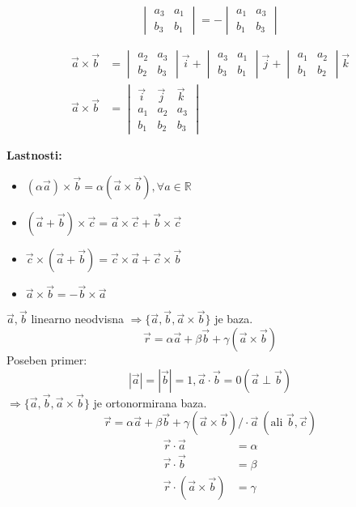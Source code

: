 \[
\begin{vmatrix}
a_3 & a_1\\
b_3 & b_1
\end{vmatrix}
= -
\begin{vmatrix}
a_1 & a_3 \\
b_1 & b_3
\end{vmatrix}
\]

\begin{align*}
	\vec{a} \times \vec{b} &= 
	\begin{vmatrix}
	a_2 & a_3\\
	b_2 & b_3
	\end{vmatrix}
	\vec{i} +
	\begin{vmatrix}
	a_3 & a_1 \\
	b_3 & b_1
	\end{vmatrix}
	\vec{j} +
	\begin{vmatrix}
	a_1 & a_2 \\
	b_1 & b_2
	\end{vmatrix}
	\vec{k}\\
	\vec{a} \times \vec{b} &=
	\begin{vmatrix}
	\vec{i} & \vec{j} & \vec{k}\\
	a_1 & a_2 & a_3 \\
	b_1 & b_2 & b_3
	\end{vmatrix}
\end{align*}

\textbf{Lastnosti:}
\begin{itemize}
	\item $(\alpha \vec{a}) \times \vec{b} = \alpha (\vec{a} \times \vec{b}), \forall a \in \mathbb{R}$
	\item $(\vec{a} + \vec{b}) \times \vec{c} = \vec{a} \times \vec{c} + \vec{b} \times \vec{c}$
	\item $\vec{c} \times (\vec{a} + \vec{b}) = \vec{c} \times \vec{a} + \vec{c} \times \vec{b}$
	\item $\vec{a} \times \vec{b} = - \vec{b} \times \vec{a}$
\end{itemize}

$\vec{a}, \vec{b}$ linearno neodvisna $\Rightarrow \{\vec{a}, \vec{b}, \vec{a} \times \vec{b}\}$ je baza.
\[\vec{r} = \alpha \vec{a} + \beta \vec{b} + \gamma(\vec{a} \times \vec{b})\]
Poseben primer:
\[|\vec{a}| = |\vec{b}| = 1, \vec{a} \cdot \vec{b} = 0 (\vec{a} \perp \vec{b})\]
$\Rightarrow \{\vec{a}, \vec{b}, \vec{a} \times \vec{b}\}$ je ortonormirana baza.
%
\[\vec{r} = \alpha \vec{a} + \beta \vec{b} + \gamma (\vec{a} \times \vec{b}) / \cdot \vec{a}\ (\text{ali } \vec{b}, \vec{c})\]
\begin{align*}
	\vec{r} \cdot \vec{a} &= \alpha\\
	\vec{r} \cdot \vec{b} &= \beta\\
	\vec{r} \cdot (\vec{a} \times \vec{b}) &= \gamma
\end{align*}

